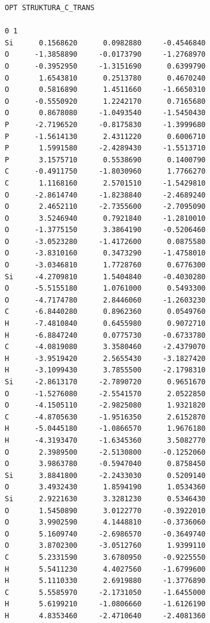 \documentclass[
digital, %
table,   %
lof,     %
lot,     %
oneside,
]{fithesis3}
\begin{document}
\begin{lstlisting}[frame=single, caption={puvodni struktura C trans },label=DescriptiveLabel]
OPT STRUKTURA_C_TRANS

0 1
Si      0.1568620      0.0982880     -0.4546840
O      -1.3858890     -0.0173790     -1.2768970
O      -0.3952950     -1.3151690      0.6399790
O       1.6543810      0.2513780      0.4670240
O       0.5816890      1.4511660     -1.6650310
O      -0.5550920      1.2242170      0.7165680
O       0.8678080     -1.0493540     -1.5450430
P      -2.7196520     -0.8175830     -1.3999680
P      -1.5614130      2.4311220      0.6006710
P       1.5991580     -2.4289430     -1.5513710
P       3.1575710      0.5538690      0.1400790
C      -0.4911750     -1.8030960      1.7766270
C       1.1168160      2.5701510     -1.5429810
O      -2.8614740     -1.8238840     -2.4689240
O       2.4652110     -2.7355600     -2.7095090
O       3.5246940      0.7921840     -1.2810010
O      -1.3775150      3.3864190     -0.5206460
O      -3.0523280     -1.4172600      0.0875580
O      -3.8310160      0.3473290     -1.4758010
O      -3.0346810      1.7728760      0.6776300
Si     -4.2709810      1.5404840     -0.4030280
O      -5.5155180      1.0761000      0.5493300
O      -4.7174780      2.8446060     -1.2603230
C      -6.8440280      0.8962360      0.0549760
H      -7.4810840      0.6455980      0.9072710
H      -6.8847240      0.0775730     -0.6733780
C      -4.0819080      3.3580460     -2.4379070
H      -3.9519420      2.5655430     -3.1827420
H      -3.1099430      3.7855500     -2.1798310
Si     -2.8613170     -2.7890720      0.9651670
O      -1.5276080     -2.5541570      2.0522850
O      -4.1505110     -2.9825080      1.9321820
C      -4.8705630     -1.9516350      2.6152870
H      -5.0445180     -1.0866570      1.9676180
H      -4.3193470     -1.6345360      3.5082770
O       2.3989500     -2.5130800     -0.1252060
O       3.9863780     -0.5947040      0.8758450
Si      3.8841800     -2.2433030      0.5209140
O       3.4932430      1.8594190      1.0534360
Si      2.9221630      3.3281230      0.5346430
O       1.5450890      3.0122770     -0.3922010
O       3.9902590      4.1448810     -0.3736060
O       5.1609740     -2.6986570     -0.3649740
O       3.8702300     -3.0512760      1.9399110
C       5.2331590      3.6780950     -0.9225550
H       5.5411230      4.4027560     -1.6799600
H       5.1110330      2.6919880     -1.3776890
C       5.5585970     -2.1731050     -1.6455000
H       5.6199210     -1.0806660     -1.6126190
H       4.8353460     -2.4710640     -2.4081360

\end{lstlisting}
\end{document}
